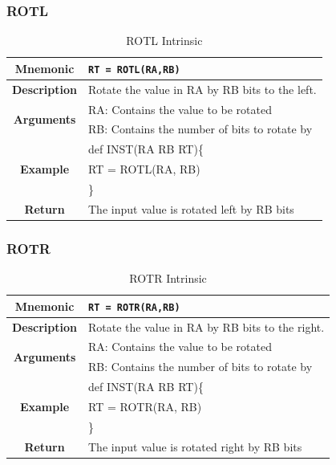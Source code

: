 \documentclass{article}
\begin{document}
\clearpage
\subsubsection{ROTL}
\label{sec:ROTL}

\begin{table}[h]
\begin{center}
\caption{ROTL Intrinsic}
\vspace{0.125in}
\label{tab:ROTLIntrinsic}
\begin{tabular}{|c|l|}
\hline
\textbf{Mnemonic} & \texttt{RT = ROTL(RA,RB)}\\
\hline
\textbf{Description} & Rotate the value in RA by RB bits to the left.\\
\hline
\multirow{2}{*}{\textbf{Arguments}} & RA: Contains the value to be rotated\\
                          			     & RB: Contains the number of bits to rotate by \\
\hline
\multirow{3}{*}{\textbf{Example}} & def INST(RA RB RT)\{\\
                          			  &   RT = ROTL(RA, RB)\\
                                                    & \}\\
\hline
\textbf{Return} & The input value is rotated left by RB bits\\                                                    
\hline
\end{tabular}
\end{center}
\end{table}

\clearpage
\subsubsection{ROTR}
\label{sec:ROTR}

\begin{table}[h]
\begin{center}
\caption{ROTR Intrinsic}
\vspace{0.125in}
\label{tab:ROTRIntrinsic}
\begin{tabular}{|c|l|}
\hline
\textbf{Mnemonic} & \texttt{RT = ROTR(RA,RB)}\\
\hline
\textbf{Description} & Rotate the value in RA by RB bits to the right.\\
\hline
\multirow{2}{*}{\textbf{Arguments}} & RA: Contains the value to be rotated\\
                          			     & RB: Contains the number of bits to rotate by \\
\hline
\multirow{3}{*}{\textbf{Example}} & def INST(RA RB RT)\{\\
                          			  &   RT = ROTR(RA, RB)\\
                                                    & \}\\
\hline
\textbf{Return} & The input value is rotated right by RB bits\\                                                    
\hline
\end{tabular}
\end{center}
\end{table}
\end{document}
